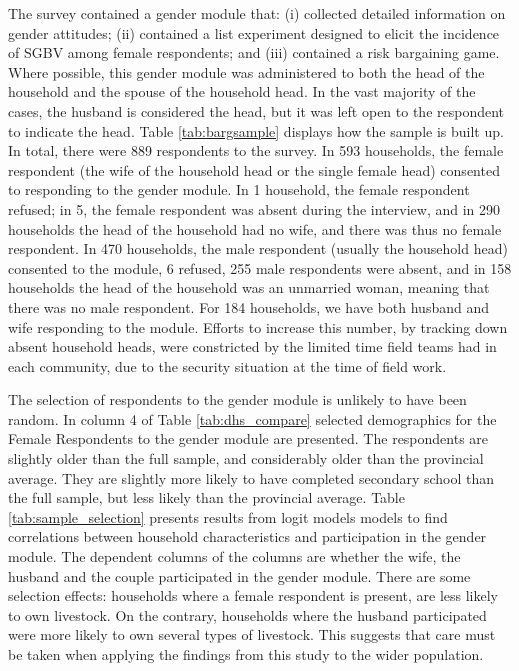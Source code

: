 \documentclass[10pt,a4paper,abstract=on]{scrartcl} %
\begin{document}
The survey contained a gender module that: (i) collected detailed information on gender attitudes; (ii) contained a list experiment designed to elicit the incidence of SGBV among female respondents; and (iii) contained a risk bargaining game. Where possible, this gender module was administered to both the head of the household and the spouse of the household head. In the vast majority of the cases, the husband is considered the head, but it was left open to the respondent to indicate the head. Table \ref{tab:bargsample} displays how the sample is built up. In total, there were 889 respondents to the survey. In 593 households, the female respondent (the wife of the household head or the single female head) consented to responding to the gender module. In 1 household, the female respondent refused; in 5, the female respondent was absent during the interview, and in 290 households the head of the household had no wife, and there was thus no female respondent. In 470 households, the male respondent (usually the household head) consented to the module, 6 refused, 255 male respondents were absent, and in 158 households the head of the household was an unmarried woman, meaning that there was no male respondent. For 184 households, we have both husband and wife responding to the module. Efforts to increase this number, by tracking down absent household heads, were constricted by the limited time field teams had in each community, due to the security situation at the time of field work.

The selection of respondents to the gender module is unlikely to have been random. In column 4 of Table \ref{tab:dhs_compare} selected demographics for the Female Respondents to the gender module are presented. The respondents are slightly older than the full sample, and considerably older than the provincial average. They are slightly more likely to have completed secondary school than the full sample, but less likely than the provincial average. Table \ref{tab:sample_selection} presents results from logit models models to find correlations between household characteristics and participation in the gender module. The dependent columns of the columns are whether the wife, the husband and the couple participated in the gender module. There are some selection effects: households where a female respondent is present, are less likely to own livestock. On the contrary, households where the husband participated were more likely to own several types of livestock. This suggests that care must be taken when applying the findings from this study to the wider population.
\end{document}
